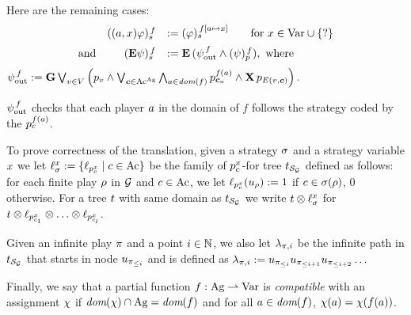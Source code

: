 Here are the remaining cases:
\[
\begin{array}{lrl}
& \tr[f]{\bind{\var}\phi}	& \egdef \tr[{f[\ag\mapsto \var]}]{\phi} \quad\quad
                          \text{for }\var\in\Varf\union\{\unb\}  \\[5pt]
\mbox{and} & \tr[f]{\Eout\psi}	& \egdef \E\,(\psiout[f] \wedge
                                 \trp[f]{\psi}), \mbox{ where}
\end{array}
\]
$\psiout[f]  \egdef \always
  \bigou_{\pos\in\setpos}\left ( p_{\pos} \et \bigou_{\jmov\in\Mov^{\Agf}} 
  \biget_{\ag\in\dom(f)}p_{\jmov_{\ag}}^{f(\ag)}\et \X\,
                          p_{\trans(\pos,\jmov)}\right ).$


$\psiout[f]$ checks that  each player $\ag$ in the domain of $f$
follows the strategy coded by the $p_\act^{f(\ag)}$. 

   
To prove correctness of the translation, given a strategy $\strat$ and
a strategy variable $\var$ we
let  $\stratlab{\var}\egdef\{\plab[{p_\act^\var}]\mid
\act\in\Act\}$ be the family of $p_\act^\var$- for tree
$\unfold[\KS_{\CGS}]{}$ defined as follows: for each
finite play $\fplay$ in $\CGS$ and $\act\in\Act$,
we let $\plab[{p_\act^\var}](\noeud_\fplay)\egdef1$ if $\act\in\strat(\fplay)$, 0 otherwise.
For a  tree $\ltree$ with same domain as
$\unfold[\KS_{\CGS}]{}$ we write $\ltree\prodlab \stratlab{\var}$ for
$\ltree\prodlab \plab[{p_{\act_1}^\var}]\prodlab\ldots\prodlab \plab[{p_{\act_\maxmov}^\var}]$.

Given an infinite play $\iplay$ and a point $i\in\setn$, we also let
$\tpath_{\iplay,i}$ be the infinite path in
$\unfold[\KS_{\CGS}]{\sstate_{\pos_\init}}$ that starts in node
$\noeud_{\iplay_{\leq i}}$ and is defined as
$\tpath_{\iplay,i}\egdef\noeud_{\iplay_{\leq i}}\noeud_{\iplay_{\leq
    i+1}}\noeud_{\iplay_{\leq i+2}}\ldots$

Finally, we say that a partial   function $f:\Agf\partialto\Varf$ is
\emph{compatible} with an assignment $\assign$ if
 $\dom(\assign)\inter \Agf=\dom(f)$ and  for all $a \in \dom(f)$,  $\assign(a) = \assign(f(a))$.

